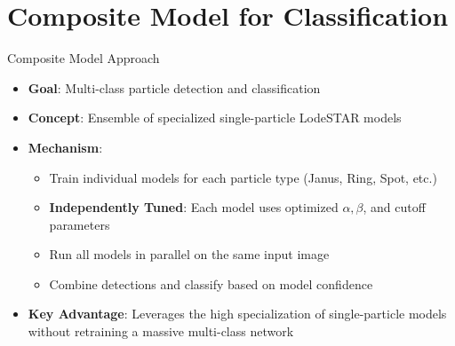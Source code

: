 \section[Composite Model]{Composite Model for Classification}

\begin{frame}{Composite Model Approach}
\begin{itemize}
    \item \textbf{Goal}: Multi-class particle detection and classification
    \item \textbf{Concept}: Ensemble of specialized single-particle LodeSTAR models
    \item \textbf{Mechanism}: 
    \begin{itemize}
        \item Train individual models for each particle type (Janus, Ring, Spot, etc.)
        \item \textbf{Independently Tuned}: Each model uses optimized $\alpha, \beta$, and cutoff parameters
        \item Run all models in parallel on the same input image
        \item Combine detections and classify based on model confidence
    \end{itemize}
    \item \textbf{Key Advantage}: Leverages the high specialization of single-particle models without retraining a massive multi-class network
\end{itemize}
\end{frame}

